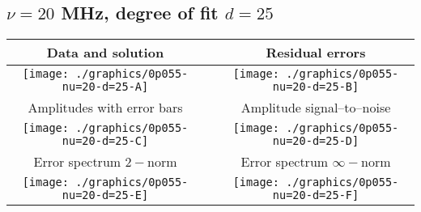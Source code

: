 

% 

\clearpage{}
\break{}

\subsection{$\nu = 20$ MHz, degree of fit $d = 25$}

\begin{table}[h]
    \begin{center}
        \begin{tabular}{ccc}
            Data and solution & \quad & Residual errors \\\hline
            \texttt{[image: ./graphics/0p055-nu=20-d=25-A]} &&
            \texttt{[image: ./graphics/0p055-nu=20-d=25-B]} \\[15pt]
            Amplitudes with error bars && Amplitude signal--to--noise \\\hline
            \texttt{[image: ./graphics/0p055-nu=20-d=25-C]} &&
            \texttt{[image: ./graphics/0p055-nu=20-d=25-D]} \\[15pt]
            Error spectrum $2-$norm && Error spectrum $\infty-$norm \\\hline
            \texttt{[image: ./graphics/0p055-nu=20-d=25-E]} &&
            \texttt{[image: ./graphics/0p055-nu=20-d=25-F]} \\[15pt]
        \end{tabular}
    \end{center}
\label{fig:elev=55, nu=20}
\end{table}



\endinput
